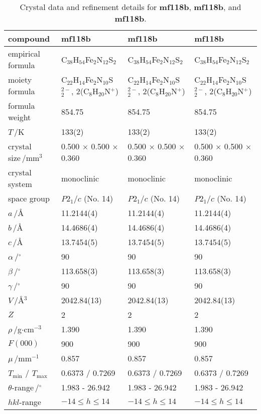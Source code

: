 \documentclass[a4paper,landscape]{scrartcl}
\begin{document}
\begin{table}[ht]
\caption{Crystal data and refinement details for \textbf{mf118b}, \textbf{mf118b}, and \textbf{mf118b}.}
\begin{tabular}{llll}
\hline
\textbf{compound} & \textbf{mf118b} & \textbf{mf118b} & \textbf{mf118b} \\
\hline
empirical formula & C$_{38}$H$_{54}$Fe$_{2}$N$_{12}$S$_{2}$ & C$_{38}$H$_{54}$Fe$_{2}$N$_{12}$S$_{2}$ & C$_{38}$H$_{54}$Fe$_{2}$N$_{12}$S$_{2}$ \\
moiety formula & C$_{22}$H$_{14}$Fe$_{2}$N$_{10}$S$_{2}^{2-}$, 2(C$_{8}$H$_{20}$N$_{}^{+}$) & C$_{22}$H$_{14}$Fe$_{2}$N$_{10}$S$_{2}^{2-}$, 2(C$_{8}$H$_{20}$N$_{}^{+}$) & C$_{22}$H$_{14}$Fe$_{2}$N$_{10}$S$_{2}^{2-}$, 2(C$_{8}$H$_{20}$N$_{}^{+}$) \\
formula weight & 854.75 & 854.75 & 854.75 \\
$T$\,/K & 133(2) & 133(2) & 133(2) \\
crystal size\,/mm$^3$ & 0.500 $\times$ 0.500 $\times$ 0.360 & 0.500 $\times$ 0.500 $\times$ 0.360 & 0.500 $\times$ 0.500 $\times$ 0.360 \\
crystal system & monoclinic & monoclinic & monoclinic \\
space group & $P2_1/c$ (No. 14) & $P2_1/c$ (No. 14) & $P2_1/c$ (No. 14) \\
$a$\,/\r{A} & 11.2144(4) & 11.2144(4) & 11.2144(4) \\
$b$\,/\r{A} & 14.4686(4) & 14.4686(4) & 14.4686(4) \\
$c$\,/\r{A} & 13.7454(5) & 13.7454(5) & 13.7454(5) \\
$\alpha$\,/$^{\circ}$ & 90 & 90 & 90 \\
$\beta$\,/$^{\circ}$ & 113.658(3) & 113.658(3) & 113.658(3) \\
$\gamma$\,/$^{\circ}$ & 90 & 90 & 90 \\
$V$\,/\r{A}$^3$ & 2042.84(13) & 2042.84(13) & 2042.84(13) \\
$Z$ & 2 & 2 & 2 \\
$\rho$\,/g$\cdot$cm$^{-3}$ & 1.390 & 1.390 & 1.390 \\
$F(000)$ & 900 & 900 & 900 \\
$\mu$\,/mm$^{-1}$ & 0.857 & 0.857 & 0.857 \\
$T_\mathrm {min}$ / $T_\mathrm {max}$ & 0.6373 / 0.7269 & 0.6373 / 0.7269 & 0.6373 / 0.7269 \\
$\theta$-range\,/$^{\circ}$ & 1.983 - 26.942 & 1.983 - 26.942 & 1.983 - 26.942 \\
$hkl$-range & $-14\leq h \leq14$ & $-14\leq h \leq14$ & $-14\leq h \leq14$ \\

\end{tabular}
\end{table}
\end{document}

